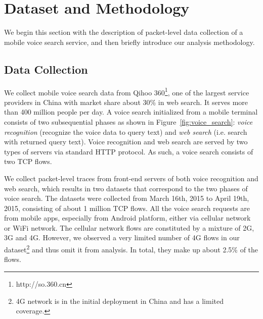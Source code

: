 
\section{Dataset and Methodology}
\label{sec:dataset}

We begin this section with the description of packet-level data collection of a mobile voice search service, and then briefly introduce our analysis methodology.

\subsection{Data Collection}

We collect mobile voice search data from Qihoo 360\footnote{http://so.360.cn}, one of the largest service providers in China with market share about 30\% in web search. It serves more than 400 million people per day. A voice search initialized from a mobile terminal consists of two subsequential phases as shown in Figure~\ref{fig:voice_search}: \emph{voice recognition} (\ie recognize the voice data to query text) and \emph{web search} (i.e. search with returned query text). Voice recognition and web search are served by two types of servers via standard HTTP protocol. As such, a voice search consists of two TCP flows.


We collect packet-level traces from front-end servers of both voice recognition and web search, which results in two datasets that correspond to the two phases of voice search. The datasets were collected from March 16th, 2015 to April 19th, 2015, consisting of about 1 million TCP flows.
All the voice search requests are from mobile apps, especially from Android platform, either via cellular network or WiFi network. The cellular network flows are constituted by a mixture of 2G, 3G and 4G. However, we observed a very limited number of 4G flows in our dataset\footnote{4G network is in the initial deployment in China and has a limited coverage.} and thus omit it from analysis. In total, they make up about 2.5\% of the flows.

